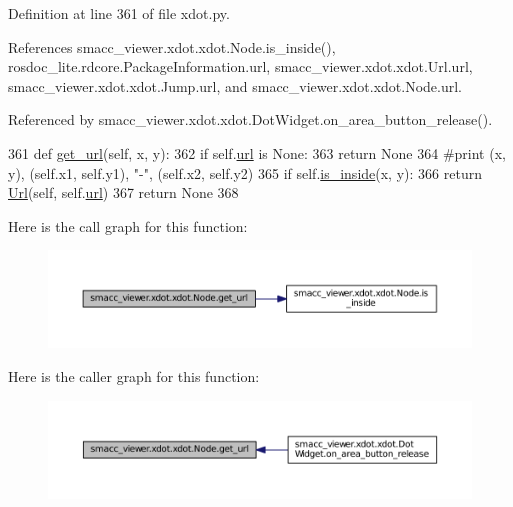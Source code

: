 Definition at line 361 of file xdot.\+py.



References smacc\+\_\+viewer.\+xdot.\+xdot.\+Node.\+is\+\_\+inside(), rosdoc\+\_\+lite.\+rdcore.\+Package\+Information.\+url, smacc\+\_\+viewer.\+xdot.\+xdot.\+Url.\+url, smacc\+\_\+viewer.\+xdot.\+xdot.\+Jump.\+url, and smacc\+\_\+viewer.\+xdot.\+xdot.\+Node.\+url.



Referenced by smacc\+\_\+viewer.\+xdot.\+xdot.\+Dot\+Widget.\+on\+\_\+area\+\_\+button\+\_\+release().


\begin{DoxyCode}
361     \textcolor{keyword}{def }\hyperlink{classsmacc__viewer_1_1xdot_1_1xdot_1_1Node_abd7b7a8ce71efaf8eaaef1f36f3ebdd1}{get\_url}(self, x, y):
362         \textcolor{keywordflow}{if} self.\hyperlink{classsmacc__viewer_1_1xdot_1_1xdot_1_1Node_af3f695c93d9d48ba998635c34580b607}{url} \textcolor{keywordflow}{is} \textcolor{keywordtype}{None}:
363             \textcolor{keywordflow}{return} \textcolor{keywordtype}{None}
364         \textcolor{comment}{#print (x, y), (self.x1, self.y1), "-", (self.x2, self.y2)}
365         \textcolor{keywordflow}{if} self.\hyperlink{classsmacc__viewer_1_1xdot_1_1xdot_1_1Node_a226e2f0e68d1bc9092a6c824359724d3}{is\_inside}(x, y):
366             \textcolor{keywordflow}{return} \hyperlink{classsmacc__viewer_1_1xdot_1_1xdot_1_1Url}{Url}(self, self.\hyperlink{classsmacc__viewer_1_1xdot_1_1xdot_1_1Node_af3f695c93d9d48ba998635c34580b607}{url})
367         \textcolor{keywordflow}{return} \textcolor{keywordtype}{None}
368 
\end{DoxyCode}


Here is the call graph for this function\+:
\nopagebreak
\begin{figure}[H]
\begin{center}
\leavevmode
\includegraphics[width=350pt]{classsmacc__viewer_1_1xdot_1_1xdot_1_1Node_abd7b7a8ce71efaf8eaaef1f36f3ebdd1_cgraph}
\end{center}
\end{figure}




Here is the caller graph for this function\+:
\nopagebreak
\begin{figure}[H]
\begin{center}
\leavevmode
\includegraphics[width=350pt]{classsmacc__viewer_1_1xdot_1_1xdot_1_1Node_abd7b7a8ce71efaf8eaaef1f36f3ebdd1_icgraph}
\end{center}
\end{figure}


